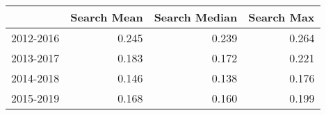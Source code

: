 \begin{table}[ht]
\centering
\begin{tabular}{rrrr}
  \hline
 & Search Mean & Search Median & Search Max \\ 
  \hline
2012-2016 & 0.245 & 0.239 & 0.264 \\ 
  2013-2017 & 0.183 & 0.172 & 0.221 \\ 
  2014-2018 & 0.146 & 0.138 & 0.176 \\ 
  2015-2019 & 0.168 & 0.160 & 0.199 \\ 
   \hline
\end{tabular}
\end{table}
